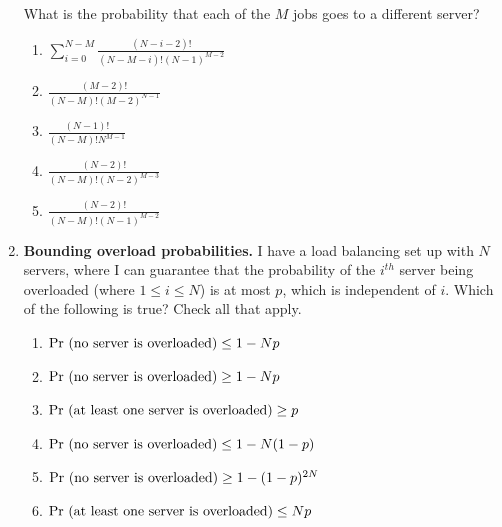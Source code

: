 \documentclass[11pt, preview]{standalone} %
\begin{document}
\begin{enumerate}
    What is the probability that each of the $M$ jobs goes to a different 
    server?
\begin{Multi}
\begin{enumerate}
    \FalseChoice\item $\sum_{i=0}^{N-M}\frac{(N-i-2)!}{(N-M-i)! (N-1)^{M-2}}$
    \FalseChoice\item $\frac{(M-2)!}{(N-M)! (M-2)^{N-1}}$
    \FalseChoice\item $\frac{(N-1)!}{(N-M)! N^{M-1}}$
    \FalseChoice\item $\frac{(N-2)!}{(N-M)! (N-2)^{M-3}}$
    \TrueChoice\item $\frac{(N-2)!}{(N-M)! (N-1)^{M-2}}$
\end{enumerate}
\end{Multi}
\item {\bf Bounding overload probabilities.} I have a load balancing set up 
    with $N$ servers, where I can guarantee that the probability of the $i^{th}$ 
    server being overloaded (where $1\leq i \leq N$) is at most $p$, which is 
    independent of $i$. Which of the following is true? Check all that apply.
    
   \begin{Multi}
\begin{enumerate}
    \FalseChoice\item $\textnormal{Pr (no server is overloaded)} \leq 1-Np$
    \TrueChoice\item $\textnormal{Pr (no server is overloaded)} \geq 1-Np$
    \TrueChoice\item $\textnormal{Pr (at least one server is overloaded)} \geq p$
    \FalseChoice\item $\textnormal{Pr (no server is overloaded)} \leq 1-N(1-p)$
    \FalseChoice\item $\textnormal{Pr (no server is overloaded)} \geq 1-(1-p)^{2N}$
    \TrueChoice\item $\textnormal{Pr (at least one server is overloaded)} \leq Np$
\end{enumerate}
\end{Multi}

\end{enumerate}
\end{document}
